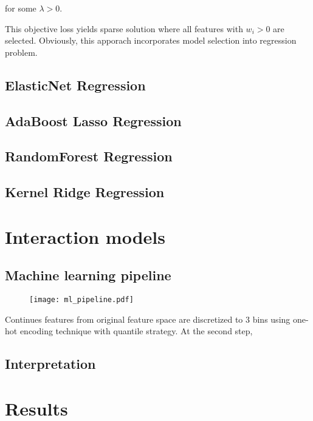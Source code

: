 \documentclass{article}
\begin{document}
for some $\lambda>0$.


This objective loss yields sparse solution where all features with $w_i>0$ are selected. Obviously, this apporach incorporates model selection into regression problem.

\subsection{ElasticNet Regression}

\subsection{AdaBoost Lasso Regression}

\subsection{RandomForest Regression}

\subsection{Kernel Ridge Regression}



\section{Interaction models}

\subsection{Machine learning pipeline}

\begin{figure}
  \texttt{[image: ml\_pipeline.pdf]}
\end{figure}

Continues features from original feature space are discretized to $3$ bins using one-hot encoding technique with quantile strategy. At the second step,  

\subsection{Interpretation}



\section{Results}
\end{document}
